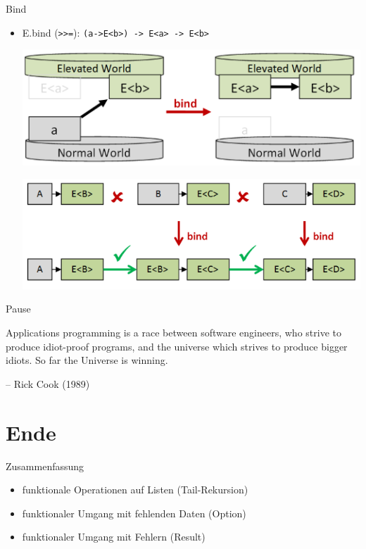 \documentclass[t]{beamer}
\begin{document}
\begin{frame}[label={sec:org763db23},fragile]{Bind}
 \begin{itemize}
\item E.bind (\texttt{>{}>{}=}): \texttt{(a->E<b>) -> E<a> -> E<b>}
\begin{center}
\includegraphics[width=.9\linewidth]{./../img/vgfp_bind.png}
\end{center}
\begin{center}
\includegraphics[width=.9\linewidth]{./../img/vgfp_bind_composition.png}
\end{center}
\end{itemize}
\end{frame}

\begin{frame}[label={sec:orgfa87a3e}]{Pause}
\begin{block}{}
Applications programming is a race between software engineers, 
who strive to produce idiot-proof programs, 
and the universe which strives to produce bigger idiots. 
So far the Universe is winning.

\null\hfill-- Rick Cook (1989)
\end{block}
\end{frame}

\section{Ende }
\label{sec:orgdc4ea8e}
\begin{frame}[label={sec:orgffcaaeb}]{Zusammenfassung}
\begin{itemize}
\item funktionale Operationen auf Listen (Tail-Rekursion)
\item funktionaler Umgang mit fehlenden Daten (Option)
\item funktionaler Umgang mit Fehlern (Result)
\end{itemize}
\end{frame}
\end{document}
